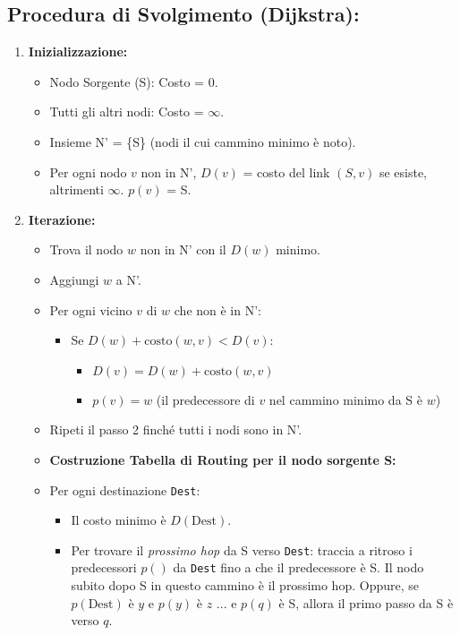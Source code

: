 \subsection{Procedura di Svolgimento (Dijkstra):}
\begin{enumerate}
    \item \textbf{Inizializzazione:}
    \begin{itemize}
        \item Nodo Sorgente (S): Costo = 0.
        \item Tutti gli altri nodi: Costo = $\infty$.
        \item Insieme N' = \{S\} (nodi il cui cammino minimo è noto).
        \item Per ogni nodo $v$ non in N', $D(v)$ = costo del link $(S,v)$ se esiste, altrimenti $\infty$. $p(v)$ = S.
    \end{itemize}
    \item \textbf{Iterazione:}
    \begin{itemize}
        \item Trova il nodo $w$ non in N' con il $D(w)$ minimo.
        \item Aggiungi $w$ a N'.
        \item Per ogni vicino $v$ di $w$ che non è in N':
        \begin{itemize}
            \item Se $D(w) + \text{costo}(w,v) < D(v)$:
            \begin{itemize}
                \item $D(v) = D(w) + \text{costo}(w,v)$
                \item $p(v) = w$ (il predecessore di $v$ nel cammino minimo da S è $w$)
            \end{itemize}
        \end{itemize}
    \item Ripeti il passo 2 finché tutti i nodi sono in N'.
    \item \textbf{Costruzione Tabella di Routing per il nodo sorgente S:}
        \item Per ogni destinazione \texttt{Dest}:
        \begin{itemize}
            \item Il costo minimo è $D(\text{Dest})$.
            \item Per trovare il \textit{prossimo hop} da S verso \texttt{Dest}: traccia a ritroso i predecessori $p()$ da \texttt{Dest} fino a che il predecessore è S. Il nodo subito dopo S in questo cammino è il prossimo hop. Oppure, se $p(\text{Dest})$ è $y$ e $p(y)$ è $z$ ... e $p(q)$ è S, allora il primo passo da S è verso $q$.
        \end{itemize}
    \end{itemize}
\end{enumerate}

